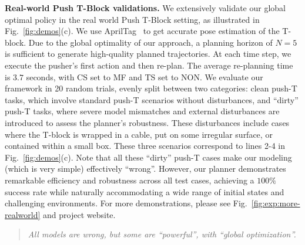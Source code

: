 \textbf{Real-world Push T-Block validations.} We extensively validate our global optimal policy in the real world Push T-Block setting, as illustrated in Fig.~\ref{fig:demos}(c). We use AprilTag~\cite{olson2011icra-apriltag} to get accurate pose estimation of the T-block. Due to the global optimality of our approach, a planning horizon of $N = 5$ is sufficient to generate high-quality planned trajectories. At each time step, we execute the pusher's first action and then re-plan. The average re-planning time is $3.7$ seconds, with CS set to MF and TS set to NON.
We evaluate our framework in 20 random trials, evenly split between two categories: clean push-T tasks, which involve standard push-T scenarios without disturbances, and ``dirty'' push-T tasks, where severe model mismatches and external disturbances are introduced to assess the planner's robustness. These disturbances include cases where the T-block is wrapped in a cable, put on some irregular surface, or contained within a small box. These three scenarios correspond to lines 2-4 in Fig.~\ref{fig:demos}(c).
Note that all these ``dirty'' push-T cases make our modeling (which is very simple) effectively ``wrong''.
However, our planner demonstrates remarkable efficiency and robustness across all test cases, achieving a $100\%$ success rate while naturally accommodating a wide range of initial states and challenging environments. 
For more demonstrations, please see Fig.~\ref{fig:exp:more-realworld} and project website.

\begin{quote}
    \textit{All models are wrong, but some are ``powerful'', with ``global optimization''.}
\end{quote}

